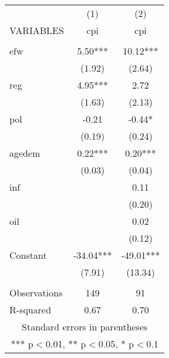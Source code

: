 \documentclass[]{article}
\begin{document}
\begin{tabular}{lcc} \hline
 & (1) & (2) \\
VARIABLES & cpi & cpi \\ \hline
 &  &  \\
efw & 5.50*** & 10.12*** \\
 & (1.92) & (2.64) \\
reg & 4.95*** & 2.72 \\
 & (1.63) & (2.13) \\
pol & -0.21 & -0.44* \\
 & (0.19) & (0.24) \\
agedem & 0.22*** & 0.20*** \\
 & (0.03) & (0.04) \\
inf &  & 0.11 \\
 &  & (0.20) \\
oil &  & 0.02 \\
 &  & (0.12) \\
Constant & -34.04*** & -49.01*** \\
 & (7.91) & (13.34) \\
 &  &  \\
Observations & 149 & 91 \\
 R-squared & 0.67 & 0.70 \\ \hline
\multicolumn{3}{c}{ Standard errors in parentheses} \\
\multicolumn{3}{c}{ *** p$<$0.01, ** p$<$0.05, * p$<$0.1} \\
\end{tabular}
\end{document}
